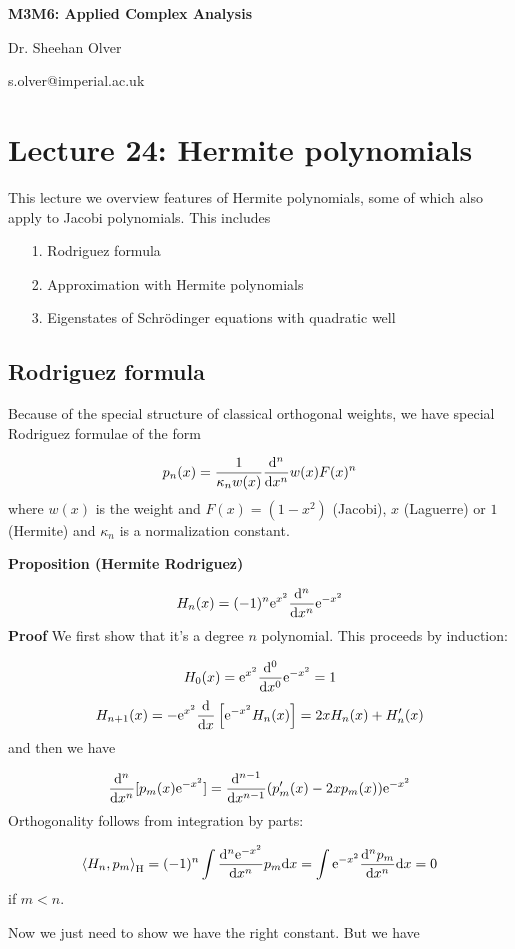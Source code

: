 \documentclass[12pt,a4paper]{article}
\def\D{ {\rm d} }
\def\E{ {\rm e} }
\def\ip<#1>{\left\langle{#1}\right\rangle}
\def\dx{\D x}
\begin{document}
\textbf{M3M6: Applied Complex Analysis}

Dr. Sheehan Olver

s.olver@imperial.ac.uk

\section{Lecture 24: Hermite polynomials}
This lecture we overview features of Hermite polynomials, some of which also  apply to Jacobi polynomials.  This includes

\begin{itemize}
\item[1. ] Rodriguez formula


\item[2. ] Approximation with Hermite polynomials


\item[3. ] Eigenstates of Schrödinger equations with quadratic well

\end{itemize}
\subsection{Rodriguez formula}
Because of the special structure of classical orthogonal weights, we have special Rodriguez formulae of the form

\[
 p_n(x) = {1 \over \kappa_n w(x)} {\D^n \over \dx^n} w(x) F(x)^n
\]
where $w(x)$ is the weight and $F(x) = (1-x^2)$ (Jacobi), $x$ (Laguerre) or $1$ (Hermite) and $\kappa_n$ is a normalization constant.

\textbf{Proposition (Hermite Rodriguez)} 

\[
H_n(x)= (-1)^n \E^{x^2}  {\D^n \over \dx^n} \E^{-x^2}
\]
\textbf{Proof} We first show that it's a degree $n$ polynomial. This proceeds by induction:

\[
 H_0(x) = \E^{x^2} {\D^0 \over \dx^0}\E^{-x^2} = 1
\]
\[
 H_{n+1}(x) = -\E^{x^2}{\D \over \dx}\left[\E^{-x^2} H_{n}(x)\right] =   2x H_{n}(x) + H_n'(x)
\]
and  then we have

\[
 {\D^n \over \dx^n}[p_m(x) \E^{-x^2}]=  {\D^{n-1} \over \dx^{n-1}}  (p_m'(x)-2x p_m(x))  \E^{-x^2}
\]
Orthogonality follows from integration by parts:

\[
\ip<H_n, p_m>_{\rm H} = (-1)^n \int  {\D^n  \E^{-x^2} \over \dx^n} p_m \dx = \int  \E^{-x^2} {\D^n p_m \over \dx^n} \dx = 0 
\]
if $m < n$.

Now we just need to show we have the right constant. But we have 
\end{document}
